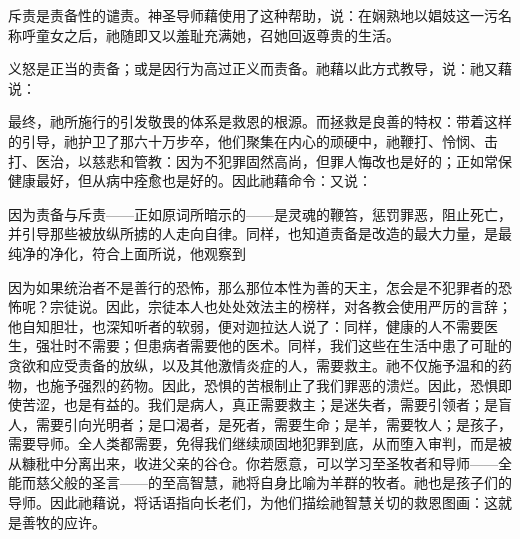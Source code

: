 斥责是责备性的谴责。神圣导师藉使用了这种帮助，说：在娴熟地以娼妓这一污名称呼童女之后，祂随即又以羞耻充满她，召她回返尊贵的生活。\par

义怒是正当的责备；或是因行为高过正义而责备。祂藉以此方式教导，说：祂又藉说：\par

最终，祂所施行的引发敬畏的体系是救恩的根源。而拯救是良善的特权：带着这样的引导，祂护卫了那六十万步卒，他们聚集在内心的顽硬中，祂鞭打、怜悯、击打、医治，以慈悲和管教：因为不犯罪固然高尚，但罪人悔改也是好的；正如常保健康最好，但从病中痊愈也是好的。因此祂藉命令：又说：\par

因为责备与斥责——正如原词所暗示的——是灵魂的鞭笞，惩罚罪恶，阻止死亡，并引导那些被放纵所掳的人走向自律。同样，也知道责备是改造的最大力量，是最纯净的净化，符合上面所说，他观察到\par

因为如果统治者不是善行的恐怖，那么那位本性为善的天主，怎会是不犯罪者的恐怖呢？宗徒说。因此，宗徒本人也处处效法主的榜样，对各教会使用严厉的言辞；他自知胆壮，也深知听者的软弱，便对迦拉达人说了：同样，健康的人不需要医生，强壮时不需要；但患病者需要他的医术。同样，我们这些在生活中患了可耻的贪欲和应受责备的放纵，以及其他激情炎症的人，需要救主。祂不仅施予温和的药物，也施予强烈的药物。因此，恐惧的苦根制止了我们罪恶的溃烂。因此，恐惧即使苦涩，也是有益的。我们是病人，真正需要救主；是迷失者，需要引领者；是盲人，需要引向光明者；是口渴者，是死者，需要生命；是羊，需要牧人；是孩子，需要导师。全人类都需要，免得我们继续顽固地犯罪到底，从而堕入审判，而是被从糠秕中分离出来，收进父亲的谷仓。你若愿意，可以学习至圣牧者和导师——全能而慈父般的圣言——的至高智慧，祂将自身比喻为羊群的牧者。祂也是孩子们的导师。因此祂藉说，将话语指向长老们，为他们描绘祂智慧关切的救恩图画：这就是善牧的应许。\par


